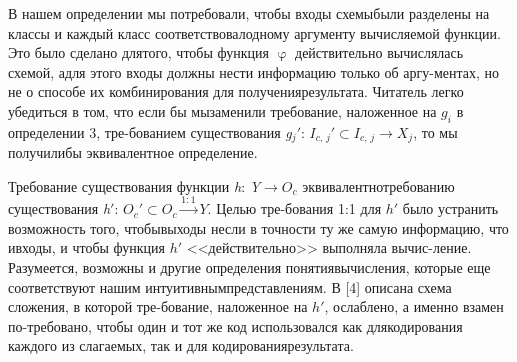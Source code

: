 \documentclass[a4paper, twoside]{article}
\begin{document}
\begin{spacing}{0.85}
\noindent В нашем определении мы потребовали, чтобы входы схемы\linebreak[4] были разделены на классы и каждый класс соответствовал\linebreak[4] одному аргументу вычисляемой функции. Это было сделано для\linebreak[4] того, чтобы функция $\upvarphi$ действительно вычислялась схемой, а\linebreak[4] для этого входы должны нести информацию только об аргу-\linebreak[4]ментах, но не о способе их комбинирования для получения\linebreak[4] результата. Читатель легко убедиться в том, что если бы мы\linebreak[4] заменили требование, наложенное на $g_{i}$ в определении 3, тре-\linebreak[4]бованием существования \textit{g$_{j}$$'$}: $I_{\textit{c, j}}'$$\subset$$I_{\textit{c, j}}$$\longrightarrow$$X_{j}$, то мы получили\linebreak[4] бы эквивалентное определение. 
\end{spacing}

\begin{spacing}{0.9}
\par Требование существования функции \textit{h}: \textit{Y}$\rightarrow$$O_{c}$ эквивалентно\linebreak[4] требованию существования \textit{h$'$}: $O_{c}'$$\subset$$O_{c}$$\overset{1:1}{\longrightarrow}$$Y$. Целью тре-\linebreak[4]бования 1:1 для $h'$ было устранить возможность того, чтобы\linebreak[4] выходы несли в точности ту же самую информацию, что и\linebreak[4] входы, и чтобы функция $h'$ <<действительно>> выполняла вычис-\linebreak[4]ление. Разумеется, возможны и другие определения понятия\linebreak[4] вычисления, которые еще соответствуют нашим интуитивным\linebreak[4] представлениям. В [4] описана схема сложения, в которой тре-\linebreak[4]бование, наложенное на $h'$, ослаблено, а именно взамен по-\linebreak[4]требовано, чтобы один и тот же код использовался как для\linebreak[4] кодирования каждого из слагаемых, так и для кодирования\linebreak[4] результата.
\end{spacing}
\end{document}
